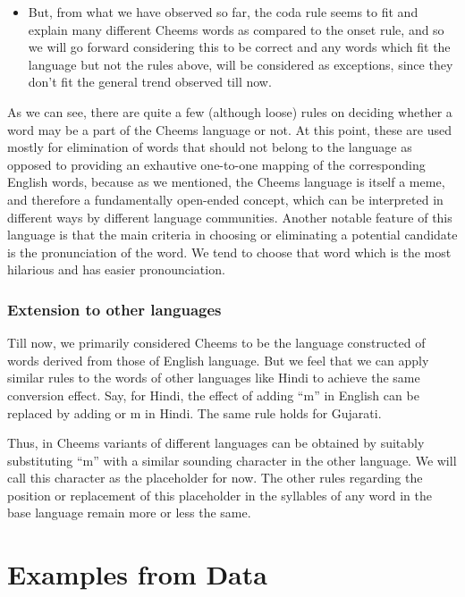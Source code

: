 \def\DevnagVersion{2.17}\documentclass{article}
\begin{document}
\begin{itemize}
    \item But, from what we have observed so far, the coda rule seems to fit and explain many different Cheems words as compared to the onset rule, and so we will go forward considering this to be correct and any words which fit the language but not the rules above, will be considered as exceptions, since they don't fit the general trend observed till now.
\end{itemize}

As we can see, there are quite a few (although loose) rules on deciding whether a word may be a part of the Cheems language or not. At this point, these are used mostly for elimination of words that should not belong to the language as opposed to providing an exhautive one-to-one mapping of the corresponding English words, because as we mentioned, the Cheems language is itself a meme, and therefore a fundamentally open-ended concept, which can be interpreted in different ways by different language communities. Another notable feature of this language is that the main criteria in choosing or eliminating a potential candidate is the pronunciation of the word. We tend to choose that word which is the most hilarious and has easier pronounciation.

\subsubsection{Extension to other languages}
Till now, we primarily considered Cheems to be the language constructed of words derived from those of English language. But we feel that we can apply similar rules to the words of other languages like Hindi to achieve the same conversion effect. Say, for Hindi, the effect of adding ``m'' in English can be replaced by adding {\dn {}} or {\dn m} in Hindi. The same rule holds for Gujarati.

Thus, in Cheems variants of different languages can be obtained by suitably substituting ``m'' with a similar sounding character in the other language. We will call this character as the placeholder for now. The other rules regarding the position or replacement of this placeholder in the syllables of any word in the base language remain more or less the same.


\section{Examples from Data}
\end{document}
